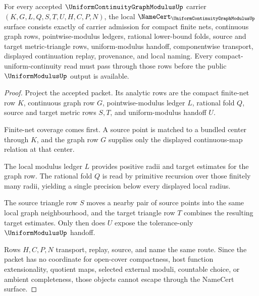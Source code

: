 \begin{theorem}
\label{thm:uniform-continuity-graph-modulus-namecert-obligations}
For every accepted $\UniformContinuityGraphModulusUp$ carrier $(K,G,L,Q,S,T,U,H,C,P,N)$, the local $\NameCert_{\UniformContinuityGraphModulusUp}$ surface consists exactly of carrier admission for compact finite nets, continuous graph rows, pointwise-modulus ledgers, rational lower-bound folds, source and target metric-triangle rows, uniform-modulus handoff, componentwise transport, displayed continuation replay, provenance, and local naming. Every compact-uniform-continuity read must pass through those rows before the public $\UniformModulusUp$ output is available.
\end{theorem}
\begin{proof}
Project the accepted packet. Its analytic rows are the compact finite-net row $K$, continuous graph row $G$, pointwise-modulus ledger $L$, rational fold $Q$, source and target metric rows $S,T$, and uniform-modulus handoff $U$.

Finite-net coverage comes first. A source point is matched to a bundled center through $K$, and the graph row $G$ supplies only the displayed continuous-map relation at that center.

The local modulus ledger $L$ provides positive radii and target estimates for the graph row. The rational fold $Q$ is read by primitive recursion over those finitely many radii, yielding a single precision below every displayed local radius.

The source triangle row $S$ moves a nearby pair of source points into the same local graph neighbourhood, and the target triangle row $T$ combines the resulting target estimates. Only then does $U$ expose the tolerance-only $\UniformModulusUp$ handoff.

Rows $H,C,P,N$ transport, replay, source, and name the same route. Since the packet has no coordinate for open-cover compactness, host function extensionality, quotient maps, selected external moduli, countable choice, or ambient completeness, those objects cannot escape through the NameCert surface.
\end{proof}


